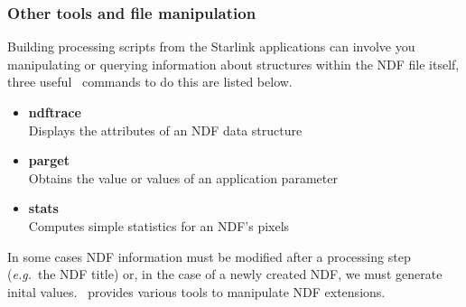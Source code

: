\documentclass[twoside,11pt]{article}
\newcommand{\htmlref}[2]{#1}
\newcommand{\xref}[3]{#1}
\begin{document}
{\subsubsection{Other tools and file manipulation}

Building processing scripts from the Starlink applications can involve
you manipulating or querying information about structures within the
NDF file itself, three useful \KAPPAref\ commands to do this are listed
below.

\begin{itemize}
\item{\xref{{\bf ndftrace}}{sun95}{NDFTRACE}}\\
Displays the attributes of an NDF data structure 
\item{\xref{{\bf parget}}{sun95}{PARGET}}\\
Obtains the value or values of an application parameter 
\item{\xref{{\bf stats}}{sun95}{STATS}}\\
Computes simple statistics for an NDF's pixels  
\end{itemize}  

In some cases NDF information must be modified after a processing step
(\emph{e.g.}\ the NDF title) or, in the case of a \htmlref{newly
created}{sc16_newndf} NDF,
we must generate inital values.  \KAPPA\ provides various tools to
manipulate NDF extensions.

}
\end{document}
